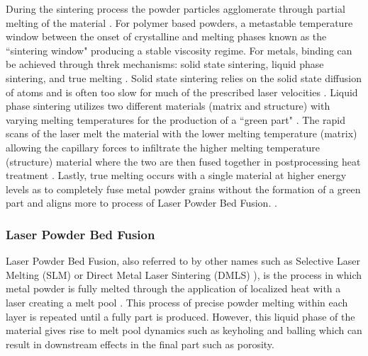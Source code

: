During the sintering process the powder particles agglomerate through partial
melting of the material \cite{kumar_selective_2003, hesselvig_efficient_2025,
kolossov_3d_2004}. For polymer based powders, a metastable temperature window
between the onset of crystalline and melting phases known as the ``sintering
window" producing a stable viscosity regime\cite{schmid_polymer_2015}. For
metals, binding can be achieved through threk mechanisms: solid state sintering,
liquid phase sintering, and true melting \cite{kruth_progress_1998}. Solid state
sintering relies on the solid state diffusion of atoms and is often too slow for
much of the prescribed laser velocities \cite{kruth_progress_1998}. Liquid phase
sintering utilizes two different materials (matrix and structure) with varying
melting temperatures for the production of a ``green part"
\cite{kruth_progress_1998}. The rapid scans of the laser melt the material with
the lower melting temperature (matrix) allowing the capillary forces to
infiltrate the higher melting temperature (structure) material where the two are
then fused together in postprocessing heat treatment \cite{kruth_progress_1998}.
Lastly, true melting occurs with a single material at higher energy levels as to
completely fuse metal powder grains without the formation of a green part and
aligns more to process of Laser Powder Bed Fusion. \cite{kruth_progress_1998}.


\subsubsection{Laser Powder Bed Fusion}
Laser Powder Bed Fusion, also referred to by other names such as Selective Laser
Melting (SLM) \cite{lober_selective_2014, sefene_state---art_2022,
tang_rapid_2016, shrestha_study_2019, vrancken_heat_2012} or Direct Metal Laser
Sintering (DMLS) \cite{khaing_direct_2001, oneill_investigation_1999,
beuth_process_2013}), is the process in which metal powder is fully melted
through the application of localized heat with a laser creating a melt pool
\cite{bostan_accurate_2025, yeung_residual_2020, zhang_engineering-guided_2024,
huang_keyhole_2022, pak_additivellm_2025, pak_thermopore_2024}. This process of
precise powder melting within each layer is repeated until a fully part is
produced. However, this liquid phase of the material gives rise to melt pool
dynamics such as keyholing \cite{huang_keyhole_2022, ki_modeling_2002,
ogoke_inexpensive_2023, tempelman_detection_2022} and balling
\cite{gu_balling_2007, bellini_additive_2021, lindstrom_simple_2023} which can
result in downstream effects in the final part such as porosity.

